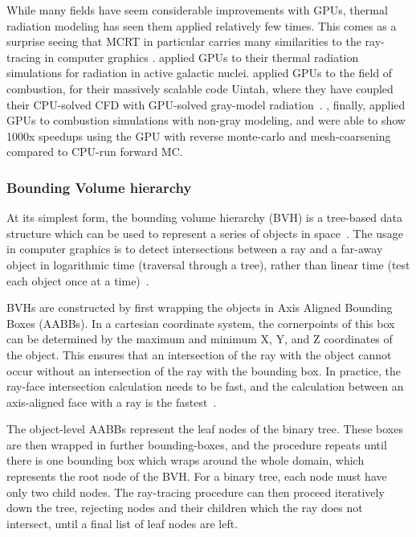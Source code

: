 While many fields have seem considerable improvements with GPUs, thermal radiation modeling has seen them applied relatively few times. This comes as a surprise seeing that MCRT in particular carries many similarities to the ray-tracing in computer graphics \cite{Zeeb2001AnGeometries}.
\citet{Heymann2012GPU-basedAGN} applied GPUs to their thermal radiation simulations for radiation in active galactic nuclei.
\citet{Humphrey2012RadiationSystem} applied GPUs to the field of combustion, for their massively scalable code Uintah, where they have coupled their CPU-solved CFD with GPU-solved gray-model radiation~\cite{Humphrey2015ATracingb,Humphrey2016RadiativeRefinement,Holmen2017ImprovingTasks,Peterson2018DemonstratingComputations}. 
\citet{Silvestri2019ASimulation}, finally, applied GPUs to combustion simulations with non-gray modeling, and were able to show 1000x speedups using the GPU with reverse monte-carlo and mesh-coarsening compared to CPU-run forward MC.

\subsubsection{Bounding Volume hierarchy}
At its simplest form, the bounding volume hierarchy (BVH) is a tree-based data structure which can be used to represent a series of objects in space~\cite{Shirley2020RayWeek,Meister2021ATracing}. The usage in computer graphics is to detect intersections between a ray and a far-away object in logarithmic time (traversal through a tree), rather than linear time (test each object once at a time)~\cite{Zeeb2001AnGeometries}.

BVHs are constructed by first wrapping the objects in Axis Aligned Bounding Boxes (AABBs). In a cartesian coordinate system, the cornerpoints of this box can be determined by the maximum and minimum X, Y, and Z coordinates of the object.
This ensures that an intersection of the ray with the object cannot occur without an intersection of the ray with the bounding box. 
In practice, the ray-face intersection calculation needs to be fast, and the calculation between an axis-aligned face with a ray is the fastest~\cite{Kay1986RayScenes}.

The object-level AABBs represent the leaf nodes of the binary tree. These boxes are then wrapped in further bounding-boxes, and the procedure repeats until there is one bounding box which wraps around the whole domain, which represents the root node of the BVH. 
For a binary tree, each node must have only two child nodes. The ray-tracing procedure can then proceed iteratively down the tree, rejecting nodes and their children which the ray does not intersect, until a final list of leaf nodes are left.

